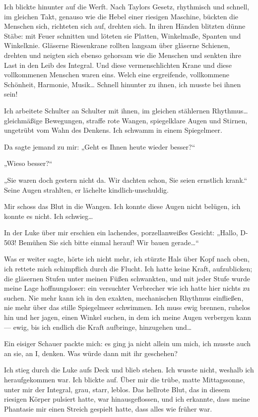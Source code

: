 Ich blickte hinunter auf die Werft. Nach Taylors Gesetz, rhythmisch
und schnell, im gleichen Takt, genauso wie die
Hebel einer riesigen Maschine, bückten die Menschen sich, richteten
sich auf, drehten sich. In ihren Händen blitzten dünne Stäbe: mit
Feuer schnitten und löteten sie Platten, Winkelmaße, Spanten und
Winkelknie. Gläserne Riesenkrane rollten langsam über gläserne
Schienen, drehten und neigten sich ebenso gehorsam wie die Menschen
und senkten ihre Last in den Leib des Integral. Und diese
vermenschlichten Krane und diese vollkommenen Menschen waren eins.
Welch eine ergreifende, vollkommene Schönheit, Harmonie, Musik\ldots{}
Schnell hinunter zu ihnen, ich musste bei ihnen sein!

Ich arbeitete Schulter an Schulter mit ihnen, im gleichen
stählernen Rhythmus\ldots{} gleichmäßige Bewegungen, straffe rote
Wangen, spiegelklare Augen und Stirnen, ungetrübt vom Wahn des
Denkens. Ich schwamm in einem Spiegelmeer.

Da sagte jemand zu mir:
%
„Geht es Ihnen heute wieder besser?“

„Wieso besser?“

„Sie waren doch gestern nicht da. Wir dachten schon, Sie seien
ernstlich krank.“ Seine Augen strahlten, er lächelte
kindlich-unschuldig.

Mir schoss das Blut in die Wangen. Ich konnte diese Augen nicht
belügen, ich konnte es nicht. Ich schwieg\ldots{}

In der Luke über mir erschien ein lachendes, porzellanweißes Gesicht:
%
„Hallo, D-503! Bemühen Sie sich bitte einmal herauf! Wir bauen
gerade\ldots{}“

Was er weiter sagte, hörte ich nicht mehr, ich stürzte Hals über
Kopf nach oben, ich rettete mich schimpflich durch die Flucht. Ich
hatte keine Kraft, aufzublicken; die gläsernen Stufen unter meinen
Füßen schwankten, und mit jeder Stufe wurde meine Lage
hoffnungsloser: ein versuchter Verbrecher wie ich hatte hier nichts
zu suchen. Nie mehr kann ich in den exakten, mechanischen Rhythmus
einfließen, nie mehr über das stille Spiegelmeer schwimmen. Ich
muss ewig brennen, ruhelos hin und her jagen, einen Winkel suchen,
in dem ich meine Augen verbergen kann — ewig, bis ich endlich die
Kraft aufbringe, hinzugehen und\ldots{}

Ein eisiger Schauer packte mich: es ging ja nicht allein um mich,
ich musste auch an sie, an I, denken. Was würde dann mit ihr
geschehen?

Ich stieg durch die Luke aufs Deck und blieb stehen. Ich wusste
nicht, weshalb ich heraufgekommen war. Ich blickte auf. Über mir
die trübe, matte Mittagssonne, unter mir der Integral, grau, starr,
leblos. Das hellrote Blut, das in diesem riesigen Körper pulsiert
hatte, war hinausgeflossen, und ich erkannte, dass meine Phantasie
mir einen Streich gespielt hatte, dass alles wie früher war.

